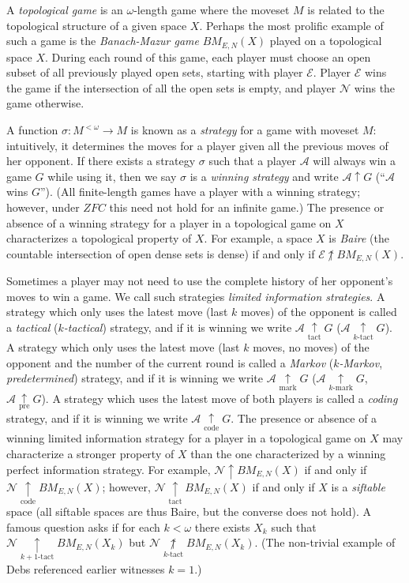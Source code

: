 \documentclass[11pt]{amsart}
\theoremstyle{plain}
\newcommand{\win}{\uparrow}
\newcommand{\prewin}{\underset{\text{pre}}{\uparrow}}
\newcommand{\markwin}{\underset{\text{mark}}{\uparrow}}
\newcommand{\tactwin}{\underset{\text{tact}}{\uparrow}}
\newcommand{\kmarkwin}[1]{\underset{#1\text{-mark}}{\uparrow}}
\newcommand{\ktactwin}[1]{\underset{#1\text{-tact}}{\uparrow}}
\newcommand{\codewin}{\underset{\text{code}}{\uparrow}}
\newcommand{\notwin}{\not\uparrow}
\newcommand{\notktactwin}[1]{\underset{#1\text{-tact}}{\not\uparrow}}
\newcommand{\<}{\langle}
\renewcommand{\>}{\rangle}
\newcommand{\pl}[1]{\mathscr{#1}}
\newcommand{\term}{\textit}
\newcommand{\bmGame}[1]{{BM}_{E,N}(#1)}
\begin{document}
A \term{topological
game} is an $\omega$-length game where the moveset $M$ is related to the
topological structure of a given space $X$.
Perhaps the most prolific example of such a game
is the \term{Banach-Mazur game} $\bmGame{X}$ played on a topological space $X$.
During each round of this game, each player must choose an open subset of all
previously played open sets, starting with player $\pl E$.
Player $\pl E$ wins the game if the intersection
of all the open sets is empty, and player $\pl N$ wins the game otherwise.

A function $\sigma:M^{<\omega}\to M$ is known as a \term{strategy} for a game
with moveset $M$: intuitively, it determines the moves for a player given
all the previous moves of her opponent. If there exists a strategy $\sigma$
such that a player $\pl A$ will always win a game $G$ while using it, then
we say $\sigma$ is a \term{winning strategy} and write $\pl A\win G$
(``$\pl A$ wins $G$''). (All finite-length games have a player with a
winning strategy; however, under $ZFC$ this need not
hold for an infinite game.) The presence or absence of a winning strategy for
a player in a topological game on $X$ characterizes
a topological property of $X$. For example, a space $X$ is \term{Baire}
(the countable intersection of open dense sets is dense) if and only if
$\pl E\notwin \bmGame{X}$.

Sometimes a player may not need to use the complete history of her opponent's
moves to win a game. We call such strategies
\term{limited information strategies}. A strategy
which only uses the latest move (last $k$ moves) of the opponent is called
a \term{tactical} (\term{$k$-tactical}) strategy, and if it is winning we
write $\pl A\tactwin G$ ($\pl A\ktactwin{k} G$). A strategy
which only uses the latest move (last $k$ moves, no moves) of the opponent
and the number of the current round is called a \term{Markov} (\term{$k$-Markov},
\term{predetermined}) strategy, and if it is winning we
write $\pl A\markwin G$ ($\pl A\kmarkwin{k} G$, $\pl A\prewin G$). A strategy
which uses the latest move of both players is called a \term{coding} strategy,
and if it is winning we write $\pl A\codewin G$. The presence or absence
of a winning limited information strategy for a player in a topological game
on $X$ may characterize a stronger property of $X$ than the one characterized
by a winning perfect information strategy. For example, $\pl N \win \bmGame X$
if and only if $\pl N \codewin \bmGame X$; however, $\pl N \tactwin \bmGame X$
if and only if $X$ is a \term{siftable} space (all siftable spaces are thus
Baire, but the converse does not hold). A famous question asks if for each
$k<\omega$ there exists $X_k$ such that $\pl N\ktactwin{k+1}\bmGame{X_k}$
but $\pl N\notktactwin{k}\bmGame{X_k}$. (The non-trivial example of Debs
referenced earlier witnesses $k=1$.)
\end{document}
